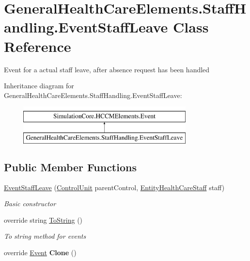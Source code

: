 \hypertarget{class_general_health_care_elements_1_1_staff_handling_1_1_event_staff_leave}{}\section{General\+Health\+Care\+Elements.\+Staff\+Handling.\+Event\+Staff\+Leave Class Reference}
\label{class_general_health_care_elements_1_1_staff_handling_1_1_event_staff_leave}


Event for a actual staff leave, after absence request has been handled  


Inheritance diagram for General\+Health\+Care\+Elements.\+Staff\+Handling.\+Event\+Staff\+Leave\+:\begin{figure}[H]
\begin{center}
\leavevmode
\includegraphics[height=2.000000cm]{class_general_health_care_elements_1_1_staff_handling_1_1_event_staff_leave}
\end{center}
\end{figure}
\subsection*{Public Member Functions}
\begin{DoxyCompactItemize}
\item 
\hyperlink{class_general_health_care_elements_1_1_staff_handling_1_1_event_staff_leave_a2e526c74a2a79f66204873f1ae91704a}{Event\+Staff\+Leave} (\hyperlink{class_simulation_core_1_1_h_c_c_m_elements_1_1_control_unit}{Control\+Unit} parent\+Control, \hyperlink{class_general_health_care_elements_1_1_entities_1_1_entity_health_care_staff}{Entity\+Health\+Care\+Staff} staff)
\begin{DoxyCompactList}\small\item\em Basic constructor \end{DoxyCompactList}\item 
override string \hyperlink{class_general_health_care_elements_1_1_staff_handling_1_1_event_staff_leave_a648cba68e3b982feec47da54b663dc90}{To\+String} ()
\begin{DoxyCompactList}\small\item\em To string method for events \end{DoxyCompactList}\item 
override \hyperlink{class_simulation_core_1_1_h_c_c_m_elements_1_1_event}{Event} {\bfseries Clone} ()\hypertarget{class_general_health_care_elements_1_1_staff_handling_1_1_event_staff_leave_aba518e232d7004a6d72b3fccf7e04863}{}\label{class_general_health_care_elements_1_1_staff_handling_1_1_event_staff_leave_aba518e232d7004a6d72b3fccf7e04863}

\end{DoxyCompactItemize}
